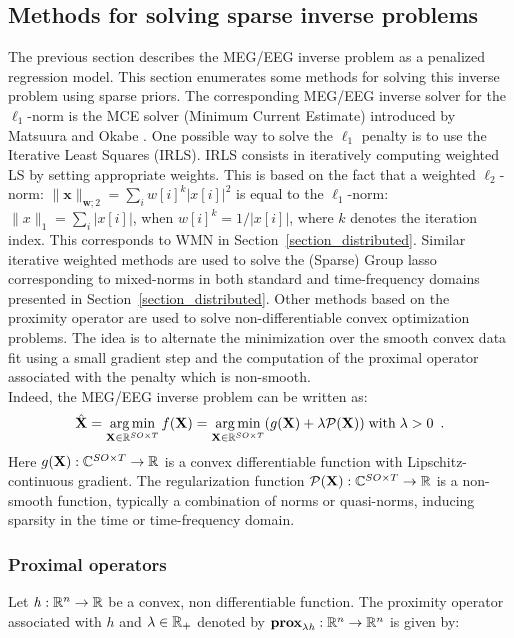 \subsection{Methods for solving sparse inverse problems}
The previous section describes the MEG/EEG inverse problem as a penalized regression model. This section enumerates some methods for solving this inverse problem using sparse priors. The corresponding MEG/EEG inverse solver for the $\ell_1$-norm is the MCE solver (Minimum Current Estimate) introduced by Matsuura and Okabe \cite{matsuura1995selective}. One possible way to solve the $\ell_1$ penalty is to use the Iterative Least Squares (IRLS). IRLS consists in iteratively computing weighted LS by setting appropriate weights. This is based on the fact that a weighted $\ell_2$-norm: $\|\mathbf{x}\|_{\mathbf{w};2}=\sum_i w[i]^k |x[i]|^2$ is equal to the $\ell_1$-norm: $\|x\|_1=\sum_i|x[i]|$, when $w[i]^k=1/|x[i]|$, where $k$ denotes the iteration index. This corresponds to WMN in Section~\ref{section_distributed}. Similar iterative weighted methods are used to solve the (Sparse) Group \ac{lasso} corresponding to mixed-norms in both standard and time-frequency domains presented in Section~\ref{section_distributed}. Other methods based on the proximity operator are used to solve non-differentiable convex optimization problems. The idea is to alternate the minimization over the smooth convex data fit using a small gradient step and the computation of the proximal operator associated with the penalty which is non-smooth.\\

Indeed, the MEG/EEG inverse problem can be written as:
\begin{equation}
\hat{\mathbf{X}} = \mathop{\mathrm{arg}\,\mathrm{min}}_{\mathbf{X}\in\mathbb{R}^{SO\times T}}f(\mathbf{X}) = \mathop{\mathrm{arg}\,\mathrm{min}}_{\mathbf{X}\in\mathbb{R}^{SO\times T}}(g(\mathbf{X}) + \lambda\mathcal{P}(\mathbf{X})) \mathrm{\;with\;} \lambda>0 \enspace .
\end{equation}
Here $g(\mathbf{X}):\mathbb{C}^{SO\times T}\rightarrow\mathbb{R}$ is a convex differentiable function with Lipschitz-continuous gradient. The regularization function $\mathcal{P}(\mathbf{X}):\mathbb{C}^{SO\times T}\rightarrow\mathbb{R}$ is a non-smooth function, typically a combination of norms or quasi-norms, inducing sparsity in the time or time-frequency domain.

\subsubsection*{Proximal operators}
Let $\mathit{h}:\mathbb{R}^n\rightarrow\mathbb{R}$ be a convex, non differentiable function. The proximity operator associated with $\mathit{h}$ and $\lambda\in\mathbb{R}_+$ denoted by
$\textbf{prox}_{\lambda\mathit{h}}:\mathbb{R}^n\rightarrow\mathbb{R}^n$ is given by:

